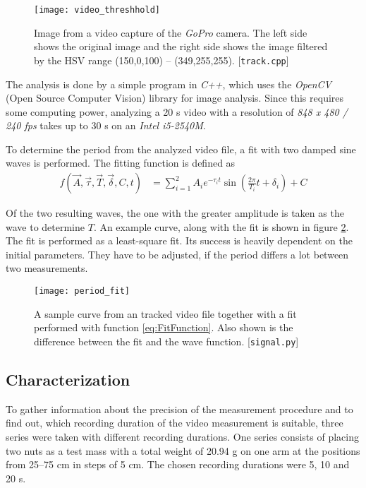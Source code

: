 \documentclass[journal]{IEEEtran}
\begin{document}
\begin{figure}
	\centering
	\texttt{[image: video\_threshhold]}
	\caption{Image from a video capture of the \emph{GoPro} camera. The left side shows the original image and the right side shows the image filtered by the HSV range (150,0,100) -- (349,255,255). [\texttt{track.cpp}]}
	\label{fig:VideoThreshhold}
\end{figure}

The analysis is done by a simple program in \emph{C++}, which uses the \emph{OpenCV} (Open Source Computer Vision) library for image analysis.
Since this requires some computing power, analyzing a 20 s video with a resolution of \emph{848 x 480 / 240 fps} takes up to 30 s on an \emph{Intel i5-2540M}.

To determine the period from the analyzed video file, a fit with two damped sine waves is performed. The fitting function is defined as
\begin{align}
	f(\vec{A}, \vec{\tau}, \vec{T}, \vec{\delta}, C, t) & = \sum_{i=1}^2 A_i e^{-\tau_i t} \sin \left( \frac{2\pi}{T_i} t + \delta_i \right) + C
	\label{eq:FitFunction}
\end{align}

Of the two resulting waves, the one with the greater amplitude is taken as the wave to determine $T$. An example curve, along with the fit is shown in figure \ref{fig:PeriodFit}.
The fit is performed as a least-square fit. Its success is heavily dependent on the initial parameters.
They have to be adjusted, if the period differs a lot between two measurements.

\begin{figure}
	\centering
	\texttt{[image: period\_fit]}
	\caption{A sample curve from an tracked video file together with a fit performed with function \eqref{eq:FitFunction}. Also shown is the difference between the fit and the wave function. [\texttt{signal.py}]}
	\label{fig:PeriodFit}
\end{figure}

\subsection{Characterization}

To gather information about the precision of the measurement procedure and to find out, which recording duration of the video measurement is suitable, three series were taken with different recording durations.
One series consists of placing two nuts as a test mass with a total weight of 20.94 g on one arm at the positions from 25--75 cm in steps of 5 cm.
The chosen recording durations were 5, 10 and 20 s.
\end{document}
